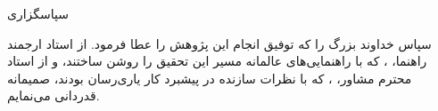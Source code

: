 \thispagestyle{empty}
\vspace*{\fill}
\begin{center}
  {\nastaliq \Large سپاسگزاری}
\end{center}
\vspace{1.2em}

\noindent
\begin{center}
\begingroup \LARGE \nastaliq
سپاس خداوند بزرگ را که توفیق انجام این پژوهش را عطا فرمود. از استاد ارجمند
راهنما، \textbf{\SupervisorOneFA}، که با راهنمایی‌های عالمانه مسیر این تحقیق را
روشن ساختند، و از استاد محترم مشاور، \textbf{\AdvisorOneFA}، که با نظرات
سازنده در پیشبرد کار یاری‌رسان بودند، صمیمانه قدردانی می‌نمایم.
\endgroup
\end{center}
\vspace*{\fill}
\clearpage
